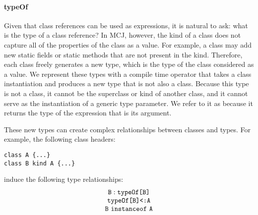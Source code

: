 \documentclass[10pt]{acm-sigplan}
\begin{document}


\paragraph{typeOf}

Given that class references can be used as expressions, it is natural
to ask: what is the type of a class reference?  In MCJ, however, the
kind of a class does not capture all of the properties of the class as
a value.  For example, a class may add new static fields or static
methods that are not present in the kind.  Therefore, each class
freely generates a new type, which is the type of the class considered
as a value.  We represent these types with a compile time
{} operator that takes a class instantiation and produces
a new type that is not also a class.  Because this type is not a class, it
cannot be the superclass or kind of another class, and it cannot serve
as the instantiation of a generic type parameter.  We refer to it as
{} because it returns the type of the expression that is its
argument.

These new types can create complex relationships between classes and types.  For
example, the following class headers:

\begin{verbatim}
class A {...}
class B kind A {...}
\end{verbatim}

induce the following type relationships:
\begin{displaymath}
\begin{array}{c}
{\mbox {\tt B}} : {\mathtt{{typeOf}}{\mbox{\tt [}}\mbox {\tt B}\mbox{{\tt ]}}} \\
{\mathtt{{typeOf}}{\mbox{\tt [}}\mbox {\tt B}\mbox{{\tt ]}}} \mbox{\tt <:} {\mbox {\tt A}} \\
\mbox {\tt B}~ {\mathtt {instanceof}}\ \mbox {\tt A}
\end{array}
\end{displaymath}
\end{document}
